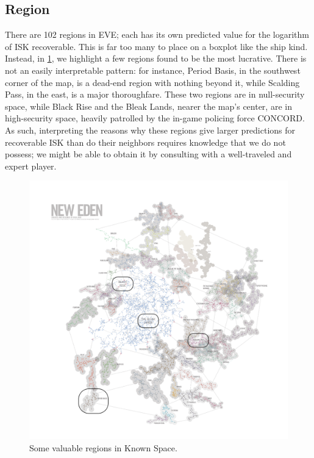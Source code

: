 \documentclass[letterpaper,12pt,article]{memoir}
\begin{document}
\subsection{Region}

There are 102 regions in EVE; each has its own predicted value for the logarithm of
ISK recoverable. This is far too many to place on a boxplot like the ship kind.
Instead, in \cref{fig:regions}, we highlight a few regions found to be the most
lucrative. There is not an easily interpretable pattern: for instance, Period
Basis, in the southwest corner of the map, is a dead-end region with nothing 
beyond it, while Scalding Pass, in the east, is a major thoroughfare. These two
regions are in null-security space, while Black Rise and the Bleak Lands, nearer 
the map's center, are in high-security space, heavily patrolled by the in-game
policing force CONCORD. As such, interpreting the reasons why these regions give
larger predictions for recoverable ISK than do their neighbors requires knowledge
that we do not possess; we might be able to obtain it by consulting with a
well-traveled and expert player.

\begin{figure}[ht]
    \centering
    \includegraphics[width=4.5in]{valuableRegions.png}
    \caption{Some valuable regions in Known Space.}
    \label{fig:regions}
\end{figure}
\end{document}
